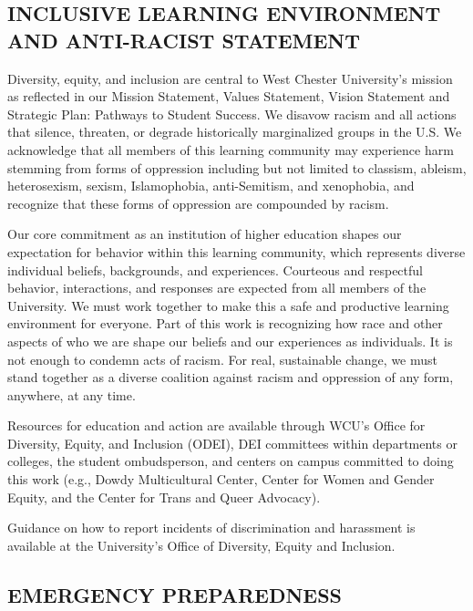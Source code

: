 \documentclass[
]{article}
\begin{document}
\hypertarget{inclusive-learning-environment-and-anti-racist-statement}{%
\subsection{INCLUSIVE LEARNING ENVIRONMENT AND ANTI-RACIST
STATEMENT}\label{inclusive-learning-environment-and-anti-racist-statement}}

Diversity, equity, and inclusion are central to West Chester
University's mission as reflected in our Mission Statement, Values
Statement, Vision Statement and Strategic Plan: Pathways to Student
Success. We disavow racism and all actions that silence, threaten, or
degrade historically marginalized groups in the U.S. We acknowledge that
all members of this learning community may experience harm stemming from
forms of oppression including but not limited to classism, ableism,
heterosexism, sexism, Islamophobia, anti-Semitism, and xenophobia, and
recognize that these forms of oppression are compounded by racism.

Our core commitment as an institution of higher education shapes our
expectation for behavior within this learning community, which
represents diverse individual beliefs, backgrounds, and experiences.
Courteous and respectful behavior, interactions, and responses are
expected from all members of the University. We must work together to
make this a safe and productive learning environment for everyone. Part
of this work is recognizing how race and other aspects of who we are
shape our beliefs and our experiences as individuals. It is not enough
to condemn acts of racism. For real, sustainable change, we must stand
together as a diverse coalition against racism and oppression of any
form, anywhere, at any time.

Resources for education and action are available through WCU's Office
for Diversity, Equity, and Inclusion (ODEI), DEI committees within
departments or colleges, the student ombudsperson, and centers on campus
committed to doing this work (e.g., Dowdy Multicultural Center, Center
for Women and Gender Equity, and the Center for Trans and Queer
Advocacy).

Guidance on how to report incidents of discrimination and harassment is
available at the University's Office of Diversity, Equity and Inclusion.

\hypertarget{emergency-preparedness}{%
\subsection{EMERGENCY PREPAREDNESS}\label{emergency-preparedness}}
\end{document}
